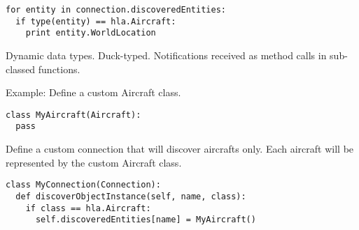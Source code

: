 \documentclass{howto}
\begin{document}
\begin{verbatim}
for entity in connection.discoveredEntities:
  if type(entity) == hla.Aircraft:
    print entity.WorldLocation
\end{verbatim}

Dynamic data types. Duck-typed.
Notifications received as method calls in sub-classed functions.

Example:
Define a custom Aircraft class.

\begin{verbatim}
class MyAircraft(Aircraft):
  pass
\end{verbatim}

Define a custom connection that will discover aircrafts only. Each aircraft will
be represented by the custom Aircraft class.

\begin{verbatim}
class MyConnection(Connection):
  def discoverObjectInstance(self, name, class):
    if class == hla.Aircraft:
      self.discoveredEntities[name] = MyAircraft()
\end{verbatim}
\end{document}
